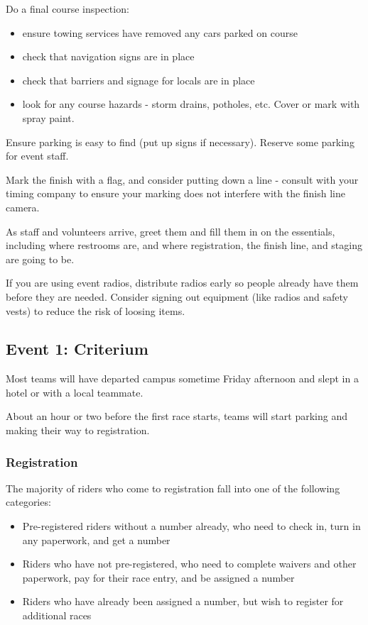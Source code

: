 \documentclass[
  letterpaper, %
  fontsize=10pt, %
  twoside=true,
  chapterentrydots=true, %
  numbers=noenddot,
  fontmethod=tex,
]{kaobook}
\begin{document}
Do a final course inspection:
\begin{itemize}
  \item ensure towing services have removed any cars parked on course
  \item check that navigation signs are in place
  \item check that barriers and signage for locals are in place
  \item look for any course hazards - storm drains, potholes, etc. Cover or mark with spray paint.
\end{itemize}

Ensure parking is easy to find (put up signs if necessary).
Reserve some parking for event staff.

Mark the finish with a flag, and consider putting down a line - consult with your timing company to ensure your marking does not interfere with the finish line camera.

As staff and volunteers arrive, greet them and fill them in on the essentials, including where restrooms are,
and where registration, the finish line, and staging are going to be.

If you are using event radios, %
distribute radios early so people already have them before they are needed.
Consider signing out equipment (like radios and safety vests) to reduce the risk of loosing items.

\subsection{Event 1: Criterium}

Most teams will have departed campus sometime Friday afternoon and slept in a hotel or with a local teammate.

About an hour or two before the first race starts,
teams will start parking and making their way to registration.

\subsubsection{Registration}

The majority of riders who come to registration fall into one of the following categories:

\begin{itemize}
  \item Pre-registered riders without a number already,
        who need to check in, turn in any paperwork, and get a number
  \item Riders who have not pre-registered,
        who need to complete waivers and other paperwork,
        pay for their race entry,
        and be assigned a number
  \item Riders who have already been assigned a number,
        but wish to register for additional races
\end{itemize}
\end{document}
